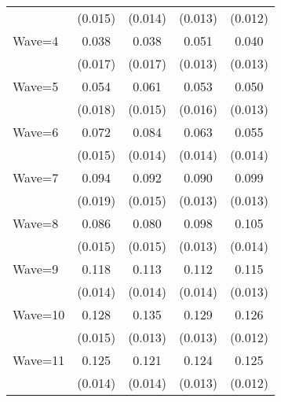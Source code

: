 {\begin{tabular}{l*{4}{c}}
                    &     (0.015)         &     (0.014)         &     (0.013)         &     (0.012)         \\
[1em]
Wave=4              &       0.038\sym{*}  &       0.038\sym{*}  &       0.051\sym{***}&       0.040\sym{**} \\
                    &     (0.017)         &     (0.017)         &     (0.013)         &     (0.013)         \\
[1em]
Wave=5              &       0.054\sym{**} &       0.061\sym{***}&       0.053\sym{***}&       0.050\sym{***}\\
                    &     (0.018)         &     (0.015)         &     (0.016)         &     (0.013)         \\
[1em]
Wave=6              &       0.072\sym{***}&       0.084\sym{***}&       0.063\sym{***}&       0.055\sym{***}\\
                    &     (0.015)         &     (0.014)         &     (0.014)         &     (0.014)         \\
[1em]
Wave=7              &       0.094\sym{***}&       0.092\sym{***}&       0.090\sym{***}&       0.099\sym{***}\\
                    &     (0.019)         &     (0.015)         &     (0.013)         &     (0.013)         \\
[1em]
Wave=8              &       0.086\sym{***}&       0.080\sym{***}&       0.098\sym{***}&       0.105\sym{***}\\
                    &     (0.015)         &     (0.015)         &     (0.013)         &     (0.014)         \\
[1em]
Wave=9              &       0.118\sym{***}&       0.113\sym{***}&       0.112\sym{***}&       0.115\sym{***}\\
                    &     (0.014)         &     (0.014)         &     (0.014)         &     (0.013)         \\
[1em]
Wave=10             &       0.128\sym{***}&       0.135\sym{***}&       0.129\sym{***}&       0.126\sym{***}\\
                    &     (0.015)         &     (0.013)         &     (0.013)         &     (0.012)         \\
[1em]
Wave=11             &       0.125\sym{***}&       0.121\sym{***}&       0.124\sym{***}&       0.125\sym{***}\\
                    &     (0.014)         &     (0.014)         &     (0.013)         &     (0.012)         \\

\end{tabular}}
